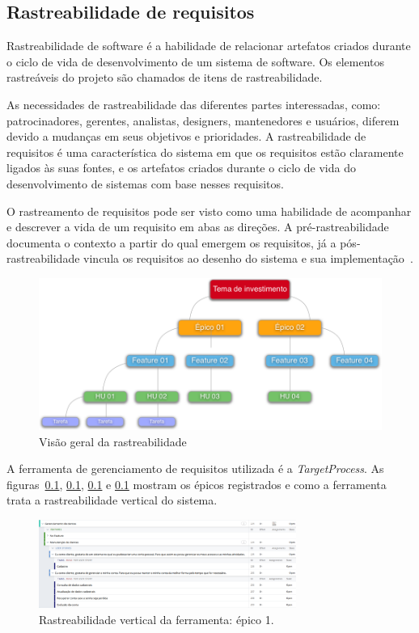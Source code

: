 \subsection{Rastreabilidade de requisitos}
Rastreabilidade de software é a habilidade de relacionar artefatos criados durante o ciclo de vida de desenvolvimento de um sistema de software. Os elementos rastreáveis do projeto são chamados de itens de rastreabilidade.

As necessidades de rastreabilidade das diferentes partes interessadas, como: patrocinadores, gerentes, analistas, designers, mantenedores e usuários, diferem devido a mudanças em seus objetivos e prioridades. A rastreabilidade de requisitos é uma característica do sistema em que os requisitos estão claramente ligados às suas fontes, e os artefatos criados durante o ciclo de vida do desenvolvimento de sistemas com base nesses requisitos.

O rastreamento de requisitos pode ser visto como uma habilidade de acompanhar e descrever a vida de um requisito em abas as direções. A pré-rastreabilidade documenta o contexto a partir do qual emergem os requisitos, já a pós-rastreabilidade vincula os requisitos ao desenho do sistema e sua implementação~\cite{davis}.

\begin{figure}[!htbp]
\centering
\includegraphics[scale=0.45]{figuras/matriz_rastreabilidade}
\caption[Visão geral da rastreabilidade]{Visão geral da rastreabilidade\footnotemark}
\label{Rastreabilidade}
\end{figure}

A ferramenta de gerenciamento de requisitos utilizada é a \textit{TargetProcess}. As figuras~\ref{}, \ref{}, \ref{} e \ref{} mostram os épicos registrados e como a ferramenta trata a rastreabilidade vertical do sistema.

\begin{figure}[!htbp]
\centering
\includegraphics[width=0.75\textwidth]{figuras/targetprocess_ep1}
\caption{Rastreabilidade vertical da ferramenta: épico 1.}
\label{targetprocess_ep1}
\end{figure}

